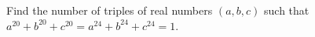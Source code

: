 Find the number of triples of real numbers $(a,b,c)$ such that $a^{20} + b^{20} + c^{20} = a^{24} + b^{24} + c^{24} =1$.
